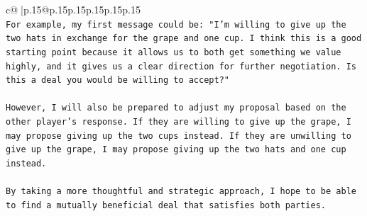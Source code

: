 \documentclass{article}
\begin{document}
{\begin{supertabular}{c@{$\;$}|p{.15\linewidth}@{}p{.15\linewidth}p{.15\linewidth}p{.15\linewidth}p{.15\linewidth}p{.15\linewidth}}
{{{\\ 
\texttt{For example, my first message could be: "I'm willing to give up the two hats in exchange for the grape and one cup. I think this is a good starting point because it allows us to both get something we value highly, and it gives us a clear direction for further negotiation. Is this a deal you would be willing to accept?"} \\
\\ 
\texttt{However, I will also be prepared to adjust my proposal based on the other player's response. If they are willing to give up the grape, I may propose giving up the two cups instead. If they are unwilling to give up the grape, I may propose giving up the two hats and one cup instead.} \\
\\ 
\texttt{By taking a more thoughtful and strategic approach, I hope to be able to find a mutually beneficial deal that satisfies both parties.} \\
            }
        }
    }
     \\ \\

\end{supertabular}
}
\end{document}
